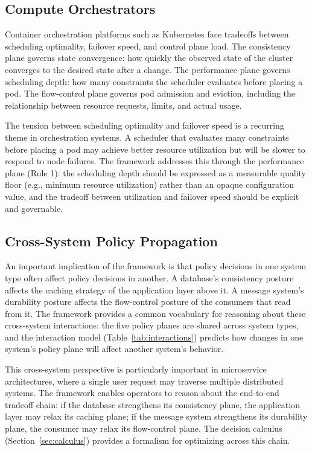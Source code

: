 \documentclass[conference]{IEEEtran}
\begin{document}
\subsection{Compute Orchestrators}

Container orchestration platforms such as Kubernetes face tradeoffs between scheduling optimality, failover speed, and control plane load. The consistency plane governs state convergence: how quickly the observed state of the cluster converges to the desired state after a change. The performance plane governs scheduling depth: how many constraints the scheduler evaluates before placing a pod. The flow-control plane governs pod admission and eviction, including the relationship between resource requests, limits, and actual usage.

The tension between scheduling optimality and failover speed is a recurring theme in orchestration systems. A scheduler that evaluates many constraints before placing a pod may achieve better resource utilization but will be slower to respond to node failures. The framework addresses this through the performance plane (Rule 1): the scheduling depth should be expressed as a measurable quality floor (e.g., minimum resource utilization) rather than an opaque configuration value, and the tradeoff between utilization and failover speed should be explicit and governable.

\subsection{Cross-System Policy Propagation}

An important implication of the framework is that policy decisions in one system type often affect policy decisions in another. A database's consistency posture affects the caching strategy of the application layer above it. A message system's durability posture affects the flow-control posture of the consumers that read from it. The framework provides a common vocabulary for reasoning about these cross-system interactions: the five policy planes are shared across system types, and the interaction model (Table~\ref{tab:interactions}) predicts how changes in one system's policy plane will affect another system's behavior.

This cross-system perspective is particularly important in microservice architectures, where a single user request may traverse multiple distributed systems. The framework enables operators to reason about the end-to-end tradeoff chain: if the database strengthens its consistency plane, the application layer may relax its caching plane; if the message system strengthens its durability plane, the consumer may relax its flow-control plane. The decision calculus (Section~\ref{sec:calculus}) provides a formalism for optimizing across this chain.
\end{document}
